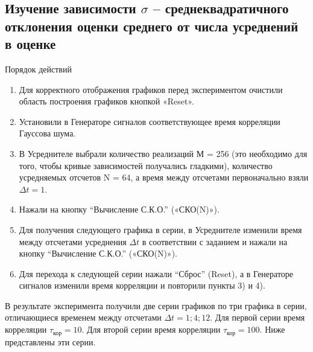 \subsection[Задание 3]{Изучение зависимости $\sigma$ -- среднеквадратичного отклонения оценки среднего от числа усреднений в оценке}
Порядок действий
\begin{enumerate}
	\item Для корректного отображения графиков перед экспериментом очистили область построения графиков кнопкой «Reset».
	\item Установили в Генераторе сигналов соответствующее время корреляции Гауссова шума.
	\item В Усреднителе выбрали количество реализаций М = 256 (это необходимо для того, чтобы кривые зависимостей получались гладкими), количество усредняемых отсчетов N = 64, а время между отсчетами первоначально взяли $\Delta t = 1$.
	\item Нажали на кнопку “Вычисление С.К.О.” («СКО(N)»).
	\item Для получения следующего графика в серии, в Усреднителе изменили время между отсчетами усреднения $\Delta t$ в соответствии с заданием и нажали на кнопку “Вычисление С.К.О.” («СКО(N)»).
	\item Для перехода к следующей серии нажали “Сброс” (Reset), а в Генераторе сигналов изменили время корреляции и повторили пункты 3) и 4).
\end{enumerate}
В результате эксперимента получили две серии графиков по три графика в серии, отличающиеся временем между отсчетами $\Delta t=1; 4; 12$.
Для первой серии время корреляции $\tau_\text{кор} = 10$. Для второй серии время корреляции $\tau_\text{кор} = 100$.
Ниже представлены эти серии.
